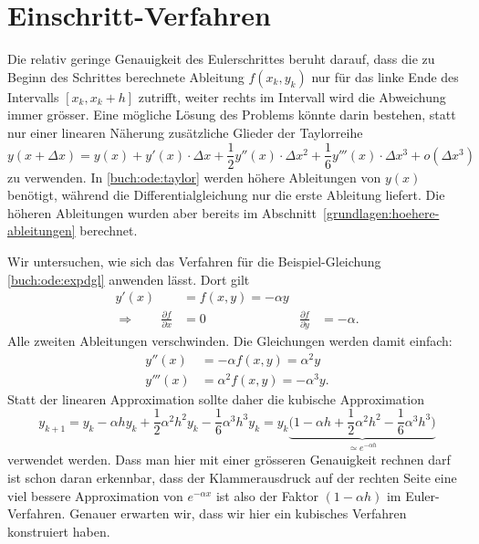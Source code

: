 %
%
%
\section{Einschritt-Verfahren\label{buch:ode:einschritt}}
Die relativ geringe Genauigkeit des Eulerschrittes beruht darauf,
dass die zu Beginn des Schrittes berechnete Ableitung $f(x_k,y_k)$
nur für das linke Ende des Intervalls $[x_k, x_k+h]$ zutrifft,
weiter rechts im Intervall wird die Abweichung immer grösser.
Eine mögliche Lösung des Problems könnte darin bestehen, statt
nur einer linearen Näherung zusätzliche Glieder der Taylorreihe
\begin{equation}
y(x+\Delta x)
=
y(x)
+
y'(x)\cdot \Delta x
+
\frac12 y''(x)\cdot \Delta x^2
+
\frac16 y'''(x)\cdot \Delta x^3
+
o(\Delta x^3)
\label{buch:ode:taylor}
\end{equation}
zu verwenden.
In \eqref{buch:ode:taylor} werden höhere Ableitungen von $y(x)$ benötigt,
während die Differentialgleichung nur die erste Ableitung liefert.
Die höheren Ableitungen wurden aber bereits im
Abschnitt~\ref{grundlagen:hoehere-ableitungen} berechnet.

Wir untersuchen, wie sich das Verfahren für die Beispiel-Gleichung
\eqref{buch:ode:expdgl} anwenden lässt.
Dort gilt
\begin{equation*}
\begin{aligned}
y'(x)&=f(x,y)=-\alpha y
\\
\Rightarrow\qquad
\frac{\partial f}{\partial x}&=0&\frac{\partial f}{\partial y}&=-\alpha.
\end{aligned}
\end{equation*}
Alle zweiten Ableitungen verschwinden.
Die Gleichungen werden damit einfach:
\begin{align*}
y''(x)&=-\alpha f(x,y)=\alpha^2 y
\\
y'''(x)&=\alpha^2f(x,y)=-\alpha^3 y.
\end{align*}
Statt der linearen Approximation sollte daher die kubische Approximation
\begin{equation}
y_{k+1}
=
y_{k}-\alpha h y_k +\frac12\alpha^2 h^2 y_k -\frac16 \alpha^3h^3 y_k
=
y_{k}\underbrace{\biggl(1-\alpha h +\frac12\alpha^2h^2 -\frac16 \alpha^3h^3\biggr)}_{\displaystyle \simeq e^{-\alpha h}}
\label{buch:ode:kubisch}
\end{equation}
verwendet werden.
Dass man hier mit einer grösseren Genauigkeit rechnen darf ist schon daran
erkennbar, dass der Klammerausdruck auf der rechten Seite eine viel
bessere Approximation von $e^{-\alpha x}$ ist also der Faktor
$(1-\alpha h)$ im Euler-Verfahren.
Genauer erwarten wir, dass wir hier ein kubisches Verfahren konstruiert haben.

